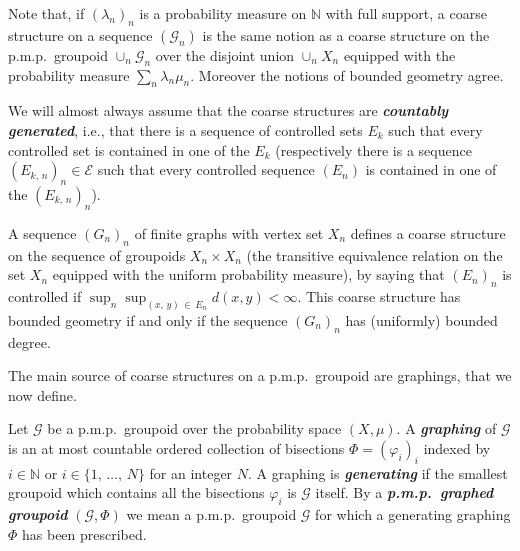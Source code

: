 \documentclass[AHL,Unicode,longabstracts,published]{cedram}
\newcommand{\defin}[1]{\textbf{\emph{#1}}}
\newcommand{\Nmath}{\mathbb{N}}
\newcommand{\coarse}{\mathcal{E}}
\newcommand{\cg}{\mathcal{G}}
\newcommand{\ph}{\varphi}
\newcommand{\pmp}{p.m.p.\ }
\begin{document}
Note that, if $(\lambda_n)_n$ is a probability measure on $\Nmath$ with full support, a coarse structure on a sequence $(\cg_n)$ is the same notion as a coarse structure on the \pmp groupoid $\cup_n \cg_n$ over the disjoint union $\cup_n X_n$ equipped with the probability measure $\sum_n \lambda_n \mu_n$. Moreover the notions of bounded geometry agree.

We will almost always assume that the coarse structures are
\defin{countably generated}, i.e., that there is a sequence of controlled sets $E_k$ such that every controlled set is contained in one of the $E_k$ (respectively there is a sequence $(E_{k,\,n})_n \in \coarse$ such that every controlled sequence $(E_n)$ is contained in one of the $(E_{k,\,n})_n$).

\begin{exam}\label{ex:coarse_structure_on_graphs}
A sequence $(G_n)_n$ of finite graphs with vertex set $X_n$ defines a coarse structure on the sequence of groupoids $X_n \times X_n$ (the transitive equivalence relation on the set $X_n$ equipped with the uniform probability measure), by saying that $(E_n)_n$ is controlled if $\sup_n \sup_{(x,\,y)\,\in\,E_n} d(x,y)< \infty$. This coarse structure has bounded geometry if and only if the sequence $(G_n)_n$ has (uniformly) bounded degree.
\end{exam}


The main source of coarse structures on a \pmp groupoid are graphings, that we now define.

\begin{defi}[Graphings]\label{dfn:graphing}
Let $\cg$ be a \pmp groupoid over the probability space $(X,\mu)$. A \defin{graphing} of $\cg$ is an at most countable ordered collection of bisections $\Phi=(\ph_i)_i$ indexed by $i \in \Nmath$ or $i \in \{1,\,\dots,\,N\}$ for an integer $N$. A graphing is \defin{generating} if the smallest groupoid which contains all the bisections $\ph_i$ is $\cg$ itself. By a
\defin{\pmp graphed groupoid} $(\cg,\Phi)$ we mean a \pmp groupoid $\cg$ for which a generating graphing $\Phi$ has been prescribed.
\end{defi}
\end{document}
